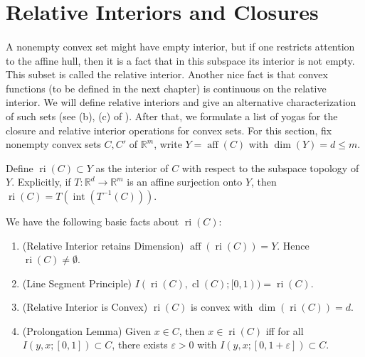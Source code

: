 \section{Relative Interiors and Closures}
\label{sect:012}

\paragraph{}A nonempty convex set might have empty interior, but if one restricts attention to the affine hull, then it is a fact that in this subspace its interior is not empty. This subset is called the relative interior. Another nice fact is that convex functions (to be defined in the next chapter) is continuous on the relative interior. We will define relative interiors and give an alternative characterization of such sets (see (b), (c) of ). After that, we formulate a list of yogas for the closure and relative interior operations for convex sets. For this section, fix nonempty convex sets $C,C'$ of $\mathbb{R}^m$, write $Y=\operatorname{aff}(C)$ with $\dim(Y)=d\leq m$.

\begin{defn}
	\label{defn:012-relint}
	Define $\operatorname{ri}(C)\subset Y$ as the interior of $C$ with respect to the subspace topology of $Y$. Explicitly, if $T:\mathbb{R}^d\to \mathbb{R}^m$ is an affine surjection onto $Y$, then $\operatorname{ri}(C)=T (\operatorname{int}(T^{-1}(C)))$.
\end{defn}

\begin{prop}We have the following basic facts about $\operatorname{ri}(C)$:
	\label{prop:012-basic-ri}
	\begin{enumerate}[label=(\alph*)]
		\item (Relative Interior retains Dimension) $\operatorname{aff}(\operatorname{ri}(C))=Y$. Hence $\operatorname{ri}(C)\neq\emptyset$.
		\item (Line Segment Principle) $I(\operatorname{ri}(C),\operatorname{cl}(C);[0,1))=\operatorname{ri}(C)$.
		\item (Relative Interior is Convex) $\operatorname{ri}(C)$ is convex with $\operatorname{dim}(\operatorname{ri}(C))=d$.
		\item (Prolongation Lemma) Given $x\in C$, then $x\in \operatorname{ri}(C)$ iff for all $I(y,x;[0,1])\subset C$, there exists $\varepsilon>0$ with $I(y,x;[0,1+\varepsilon ])\subset C$.
	\end{enumerate}
\end{prop}

